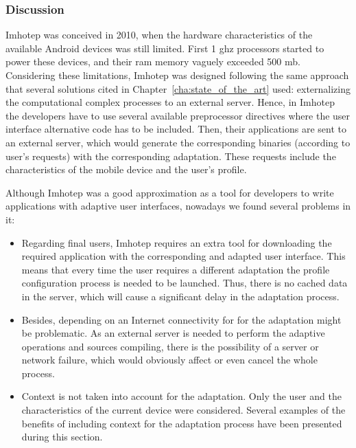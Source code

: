 \subsubsection{Discussion}
\label{sec:imhotep_discussion}

Imhotep was conceived in 2010, when the hardware characteristics of the 
available Android devices was still limited. First 1 \ac{ghz} processors started to 
power these devices, and their \ac{ram} memory vaguely exceeded 500 \ac{mb}. Considering 
these limitations, Imhotep was designed following the same approach that 
several solutions cited in Chapter~\ref{cha:state_of_the_art} used: 
externalizing the computational complex processes to an external server. Hence, 
in Imhotep the developers have to use several available preprocessor directives 
where the user interface alternative code has to be included. Then, their 
applications are sent to an external server, which would generate the 
corresponding binaries (according to user's requests) with the 
corresponding adaptation. These requests include the characteristics of the 
mobile device and the user's profile. 

Although Imhotep was a good approximation as a tool for developers to write 
applications with adaptive user interfaces, nowadays we found several problems
in it:

\begin{itemize}
  \item Regarding final users, Imhotep requires an extra tool for downloading 
  the required application with the corresponding and adapted user interface. 
  This means that every time the user requires a different adaptation the 
  profile configuration process is needed to be launched. Thus, there is no 
  cached data in the server, which will cause a significant delay in the 
  adaptation process.
  
  \item Besides, depending on an Internet connectivity for for the adaptation 
  might be problematic. As an external server is needed to perform the adaptive 
  operations and sources compiling, there is the possibility of a server or 
  network failure, which would obviously affect or even cancel the whole 
  process.
  
  \item Context is not taken into account for the adaptation. Only the user 
  and the characteristics of the current device were considered. Several 
  examples of the benefits of including context for the adaptation process have
  been presented during this section.
\end{itemize}

